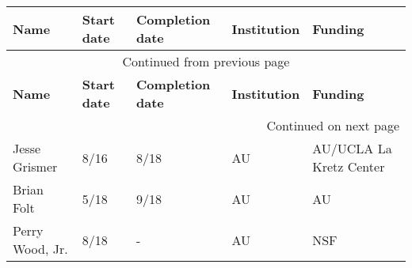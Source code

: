 {\sffamily\small
\begin{longtable}[l]{ @{} p{1.2in} p{0.5in} p{0.8in}p{0.75in} p{2in} @{} }
    \hline
    \textbf{Name} & \textbf{Start date} & \textbf{Completion date} & \textbf{Institution} & \textbf{Funding} \\
    \hline
    \endfirsthead
    \multicolumn{5}{c}{{Continued from previous page}} \\
    \hline
    \textbf{Name} & \textbf{Start date} & \textbf{Completion date} & \textbf{Institution} & \textbf{Funding} \\
    \hline
    \endhead
    \hline \multicolumn{5}{r}{{Continued on next page}} \\
    \endfoot
    \hline
    \endlastfoot
    Jesse Grismer & 8/16 & 8/18 & AU & AU/UCLA La Kretz Center \\
    Brian Folt & 5/18 & 9/18 & AU & AU \\
    Perry Wood, Jr. & 8/18 & - & AU & NSF \\
\end{longtable}
}
